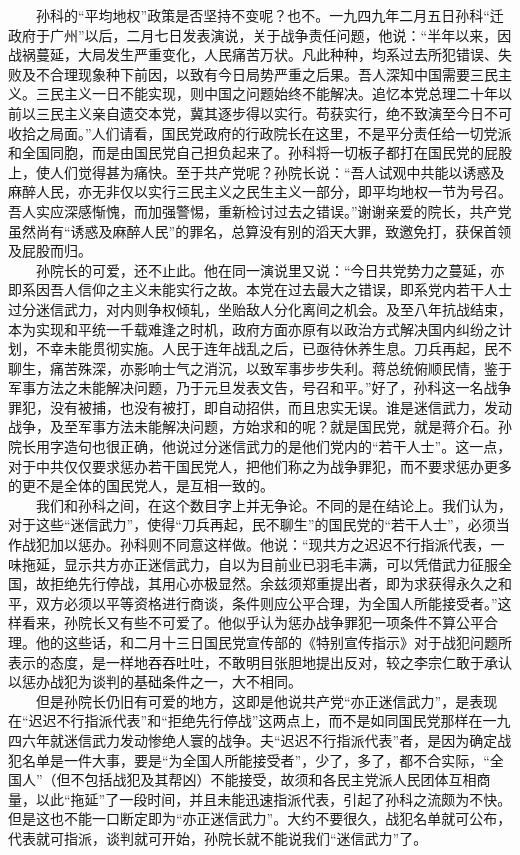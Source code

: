 \documentclass[cn,11pt,chinese]{elegantbook}
\begin{document}
　　孙科的“平均地权”政策是否坚持不变呢？也不。一九四九年二月五日孙科“迁政府于广州”以后，二月七日发表演说，关于战争责任问题，他说：“半年以来，因战祸蔓延，大局发生严重变化，人民痛苦万状。凡此种种，均系过去所犯错误、失败及不合理现象种下前因，以致有今日局势严重之后果。吾人深知中国需要三民主义。三民主义一日不能实现，则中国之问题始终不能解决。追忆本党总理二十年以前以三民主义亲自遗交本党，冀其逐步得以实行。苟获实行，绝不致演至今日不可收拾之局面。”人们请看，国民党政府的行政院长在这里，不是平分责任给一切党派和全国同胞，而是由国民党自己担负起来了。孙科将一切板子都打在国民党的屁股上，使人们觉得甚为痛快。至于共产党呢？孙院长说：“吾人试观中共能以诱惑及麻醉人民，亦无非仅以实行三民主义之民生主义一部分，即平均地权一节为号召。吾人实应深感惭愧，而加强警惕，重新检讨过去之错误。”谢谢亲爱的院长，共产党虽然尚有“诱惑及麻醉人民”的罪名，总算没有别的滔天大罪，致邀免打，获保首领及屁股而归。\\
　　孙院长的可爱，还不止此。他在同一演说里又说：“今日共党势力之蔓延，亦即系因吾人信仰之主义未能实行之故。本党在过去最大之错误，即系党内若干人士过分迷信武力，对内则争权倾轧，坐贻敌人分化离间之机会。及至八年抗战结束，本为实现和平统一千载难逢之时机，政府方面亦原有以政治方式解决国内纠纷之计划，不幸未能贯彻实施。人民于连年战乱之后，已亟待休养生息。刀兵再起，民不聊生，痛苦殊深，亦影响士气之消沉，以致军事步步失利。蒋总统俯顺民情，鉴于军事方法之未能解决问题，乃于元旦发表文告，号召和平。”好了，孙科这一名战争罪犯，没有被捕，也没有被打，即自动招供，而且忠实无误。谁是迷信武力，发动战争，及至军事方法未能解决问题，方始求和的呢？就是国民党，就是蒋介石。孙院长用字造句也很正确，他说过分迷信武力的是他们党内的“若干人士”。这一点，对于中共仅仅要求惩办若干国民党人，把他们称之为战争罪犯，而不要求惩办更多的更不是全体的国民党人，是互相一致的。\\
　　我们和孙科之间，在这个数目字上并无争论。不同的是在结论上。我们认为，对于这些“迷信武力”，使得“刀兵再起，民不聊生”的国民党的“若干人士”，必须当作战犯加以惩办。孙科则不同意这样做。他说：“现共方之迟迟不行指派代表，一味拖延，显示共方亦正迷信武力，自以为目前业已羽毛丰满，可以凭借武力征服全国，故拒绝先行停战，其用心亦极显然。余兹须郑重提出者，即为求获得永久之和平，双方必须以平等资格进行商谈，条件则应公平合理，为全国人所能接受者。”这样看来，孙院长又有些不可爱了。他似乎认为惩办战争罪犯一项条件不算公平合理。他的这些话，和二月十三日国民党宣传部的《特别宣传指示》对于战犯问题所表示的态度，是一样地吞吞吐吐，不敢明目张胆地提出反对，较之李宗仁敢于承认以惩办战犯为谈判的基础条件之一，大不相同。\\
　　但是孙院长仍旧有可爱的地方，这即是他说共产党“亦正迷信武力”，是表现在“迟迟不行指派代表”和“拒绝先行停战”这两点上，而不是如同国民党那样在一九四六年就迷信武力发动惨绝人寰的战争。夫“迟迟不行指派代表”者，是因为确定战犯名单是一件大事，要是“为全国人所能接受者”，少了，多了，都不合实际，“全国人”（但不包括战犯及其帮凶）不能接受，故须和各民主党派人民团体互相商量，以此“拖延”了一段时间，并且未能迅速指派代表，引起了孙科之流颇为不快。但是这也不能一口断定即为“亦正迷信武力”。大约不要很久，战犯名单就可公布，代表就可指派，谈判就可开始，孙院长就不能说我们“迷信武力”了。\\
\end{document}
